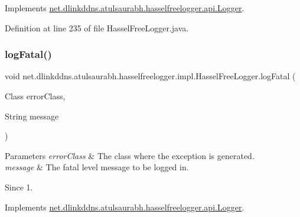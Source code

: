 Implements \mbox{\hyperlink{interfacenet_1_1dlinkddns_1_1atulsaurabh_1_1hasselfreelogger_1_1api_1_1_logger_ae8fc6e4aeac87030546af120682aa178}{net.\+dlinkddns.\+atulsaurabh.\+hasselfreelogger.\+api.\+Logger}}.



Definition at line 235 of file Hassel\+Free\+Logger.\+java.

\mbox{\label{classnet_1_1dlinkddns_1_1atulsaurabh_1_1hasselfreelogger_1_1impl_1_1_hassel_free_logger_a40d4e893854bc742145dbf2fe5d2aa43}} 
\subsubsection{\texorpdfstring{log\+Fatal()}{logFatal()}\hspace{0.1cm}{\footnotesize\ttfamily [2/3]}}
{\footnotesize\ttfamily void net.\+dlinkddns.\+atulsaurabh.\+hasselfreelogger.\+impl.\+Hassel\+Free\+Logger.\+log\+Fatal (\begin{DoxyParamCaption}\item[{Class}]{error\+Class,  }\item[{String}]{message }\end{DoxyParamCaption})}


\begin{DoxyParams}{Parameters}
{\em error\+Class} & The class where the exception is generated. \\
\hline
{\em message} & The fatal level message to be logged in. \\
\hline
\end{DoxyParams}
\begin{DoxySince}{Since}
1. 
\end{DoxySince}


Implements \mbox{\hyperlink{interfacenet_1_1dlinkddns_1_1atulsaurabh_1_1hasselfreelogger_1_1api_1_1_logger_a05f87f45fe4302254060a2dac3429207}{net.\+dlinkddns.\+atulsaurabh.\+hasselfreelogger.\+api.\+Logger}}.



